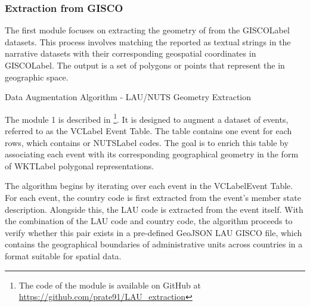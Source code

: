 \subsubsection{Extraction from GISCO}\label{VII-subsubsec:gisco}
The first module focuses on extracting the geometry of  from the \acrshort{GISCOLabel} datasets. This process involves matching the  reported as textual strings in the narrative datasets with their corresponding geospatial coordinates in \acrshort{GISCOLabel}. The output is a set of polygons or points that represent the  in geographic space.


\begin{algorithm}[H]
\caption{Data Augmentation Algorithm - LAU/NUTS Geometry Extraction}
\label{alg:gisco}
\SetAlgoLined
{}
\end{algorithm}

The module 1 is described in \footnote{The code of the module is available on GitHub at \url{https://github.com/prate91/LAU_extraction}}. It is designed to augment a dataset of events, referred to as the \acrshort{VCLabel} Event Table. The table contains one event for each rows, which contains  or \acrfull{NUTSLabel} codes. The goal is to enrich this table by associating each event with its corresponding geographical geometry in the form of \acrshort{WKTLabel} polygonal representations.

The algorithm begins by iterating over each event in the \acrshort{VCLabel}Event Table. For each event, the country code is first extracted from the event's member state description. Alongside this, the LAU code is extracted from the event itself. With the combination of the LAU code and country code, the algorithm proceeds to verify whether this pair exists in a pre-defined GeoJSON LAU GISCO file, which contains the geographical boundaries of administrative units across countries in a format suitable for spatial data.

